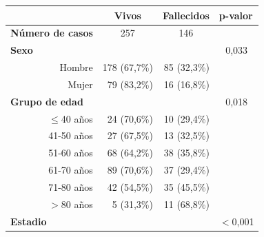 \begin{table}[H]
	\centering
	\begin{tabular}{rrrc}
		\cline{2-4}
		\multicolumn{1}{l}{}                           & \multicolumn{1}{c}{\textbf{Vivos}} & \multicolumn{1}{c}{\textbf{Fallecidos}} & \multicolumn{1}{l}{\textbf{p-valor}} \\ \hline
		\multicolumn{1}{l}{\textbf{Número de casos}} & \multicolumn{1}{c}{257}            & \multicolumn{1}{c}{146}     & \multicolumn{1}{l}{}                     \\ \hline
		\multicolumn{1}{l}{\textbf{Sexo}}              &                           &                             & 0,033                                    \\
		Hombre                                         & 178 (67,7\%)              & 85 (32,3\%)                 &                                          \\
		Mujer                                          & 79 (83,2\%)               & 16 (16,8\%)                 &                                          \\ \hline
		\multicolumn{1}{l}{\textbf{Grupo de edad}}     &                           &                             & 0,018                                    \\
		$\leq$40 años                                      & 24 (70,6\%)               & 10 (29,4\%)                 &                                          \\
		41-50 años                                     & 27 (67,5\%)               & 13 (32,5\%)                 &                                          \\
		51-60 años                                     & 68 (64,2\%)               & 38 (35,8\%)                 &                                          \\
		61-70 años                                     & 89 (70,6\%)               & 37 (29,4\%)                 &                                          \\
		71-80 años                                     & 42 (54,5\%)               & 35 (45,5\%)                 &                                          \\
		$>$80 años                                   & 5 (31,3\%)                & 11 (68,8\%)                 &                                          \\ \hline
		\multicolumn{1}{l}{\textbf{Estadio}}           &                           &                             & $<$0,001                         \\

\end{tabular}
\end{table}
